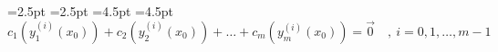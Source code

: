 \documentclass[twoside,nofonts,internet,shmeiwseis,11pt]{thewria}
\begin{document}
=2.5pt
=2.5pt
=4.5pt
=4.5pt 
\[ c_1\left( y_1^{(i)}(x_0)\right)+c_2\left( y_2^{(i)}(x_0)\right)+\ldots+c_m\left( y_m^{(i)}(x_0)\right)=\vec{0}\quad,\ i=0,1,\ldots,m-1 \]
\end{document}
